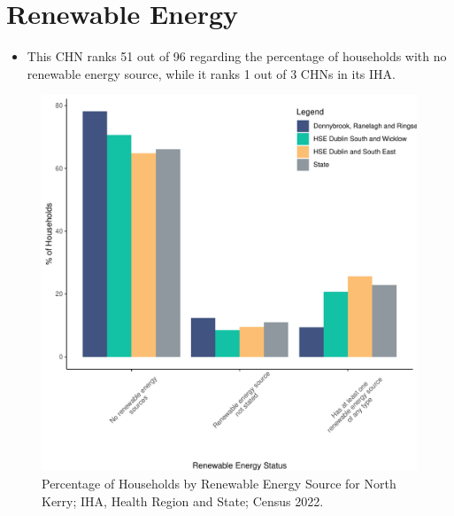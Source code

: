 \documentclass{article}
\begin{document}
\section{Renewable Energy}\label{sect:RE}
\begin{itemize}
\item This CHN ranks  51 out of 96 regarding the percentage of households with no renewable energy source, while it ranks   1 out of 3 CHNs in its IHA.
\end{itemize}
\begin{figure}[H]
	\centering
	\includegraphics[width = 140mm]{../figures/RenewableEnergyED.pdf}
	\caption{Percentage of Households by Renewable Energy Source for North Kerry; IHA, Health Region and State; Census 2022.}
	\label{fig:vbnv}
	\end{figure}
\end{document}
